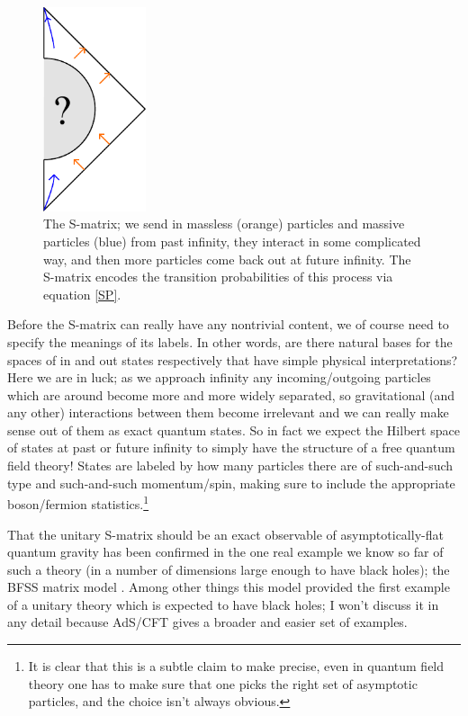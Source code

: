 \documentclass[12pt]{article}
\begin{document}
\begin{figure}
\begin{center}
\includegraphics[height=6cm]{smat.pdf}
\caption{The S-matrix; we send in massless (orange) particles and massive particles (blue) from past infinity, they interact in some complicated way, and then more particles come back out at future infinity.  The S-matrix encodes the transition probabilities of this process via equation \eqref{SP}.}\label{smat}
\end{center}
\end{figure}
Before the S-matrix can really have any nontrivial content, we of course need to specify the meanings of its labels.  In other words, are there natural bases for the spaces of in and out states respectively that have simple physical interpretations?  Here we are in luck; as we approach infinity any incoming/outgoing particles which are around become more and more widely separated, so gravitational (and any other) interactions between them become irrelevant and we can really make sense out of them as exact quantum states.  So in fact we expect the Hilbert space of states at past or future infinity to simply have the structure of a free quantum field theory!  States are labeled by how many particles there are of such-and-such type and such-and-such momentum/spin, making sure to include the appropriate boson/fermion statistics.\footnote{It is clear that this is a subtle claim to make precise, even in quantum field theory one has to make sure that one picks the right set of asymptotic particles, and the choice isn't always obvious.}

That the unitary S-matrix should be an exact observable of asymptotically-flat quantum gravity has been confirmed in the one real example we know so far of such a theory (in a number of dimensions large enough to have black holes); the BFSS matrix model \cite{Banks:1996vh}.  Among other things this model provided the first example of a unitary theory which is expected to have black holes; I won't discuss it in any detail because AdS/CFT gives a broader and easier set of examples.
\end{document}

